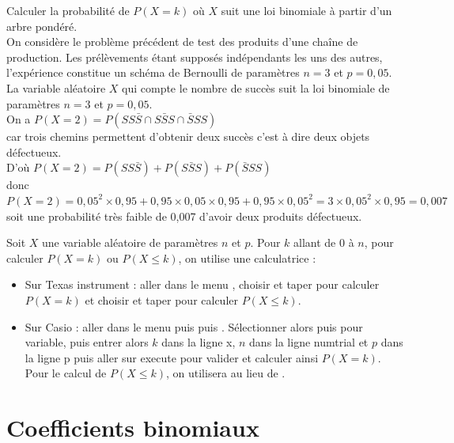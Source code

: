 \documentclass[french]{book}
\begin{document}
\begin{exemple}
Calculer la probabilité de $P(X=k)$ où $X$ suit une loi binomiale à partir d'un arbre pondéré.\\
On considère le problème précédent de test des produits d'une chaîne de production. Les prélèvements étant supposés indépendants les uns des autres, l'expérience constitue un schéma de Bernoulli de paramètres $n=3$ et $p=0,05$. La variable aléatoire $X$ qui compte le nombre de succès suit la loi binomiale de paramètres $n=3$ et $p=0,05$.\\
On a $P(X=2)=P(SS\bar{S}\cap S\bar{S}S\cap \bar{S}SS)$\\
 car trois chemins permettent d'obtenir deux succès c'est à dire deux objets défectueux.\\
D'où $P(X=2)=P(SS\bar{S})+P(S\bar{S}S)+P(\bar{S}SS)$\\
donc $P(X=2)=0,05^2\times 0,95+0,95\times 0,05\times 0,95+0,95\times 0,05^2=3\times 0,05^2\times 0,95=0,007$\\
soit une probabilité très faible de 0,007 d'avoir deux produits défectueux.
\end{exemple}

\begin{rem}[Calcul pratique de $P(X=k)$ et $P(X\leq k)$]
Soit $X$ une variable aléatoire de paramètres $n$ et $p$. Pour $k$ allant de 0 à $n$, pour calculer $P(X=k)$ ou $P(X\leq k)$, on utilise une calculatrice :
\begin{itemize}
\item[$\bullet$] Sur Texas instrument : aller dans le menu , choisir  et taper \fbox{,}\fbox{,}\fbox{)} pour calculer $P(X=k)$ et choisir  et taper \fbox{,}\fbox{,}\fbox{)} pour calculer $P(X\leq k)$.
\item[$\bullet$] Sur Casio : aller dans le menu  puis  puis . Sélectionner alors  puis  pour variable, puis entrer alors $k$  dans la ligne \og{}x\fg{}, $n$ dans la ligne \og{}numtrial\fg{} et $p$ dans la ligne \og{}p\fg{} puis aller sur \og{}execute\fg{} pour valider et calculer ainsi $P(X=k)$. Pour le calcul de  $P(X\leq k)$, on utilisera  au lieu de .
\end{itemize}
\end{rem}


\section{Coefficients binomiaux}
\end{document}
